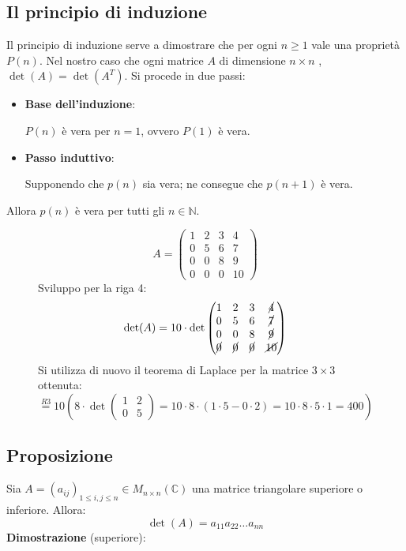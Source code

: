 \documentclass[a4paper]{article}
\theoremstyle{break}
\theoremstyle{break}
\theoremstyle{break}
\theoremstyle{break}
\begin{document}
\subsection{Il principio di induzione}
Il principio di induzione serve a dimostrare che per ogni \( n \ge 1 \) vale una 
proprietà \( P(n) \). Nel nostro caso che ogni matrice \( A \) di dimensione \( n \times n \) 
, \( \det(A) = \det(A^T) \). Si procede in due passi:
\begin{itemize}
  \item \textbf{Base dell'induzione}:

    \( P(n) \) è vera per \( n = 1 \), ovvero \( P(1) \) è vera.
  \item \textbf{Passo induttivo}:

    Supponendo che \( p(n) \) sia vera; ne consegue che \( p(n+1) \) è vera.
\end{itemize}
Allora \( p(n) \) è vera per tutti gli \( n \in \mathbb{N} \).

\begin{figure}[H]
  \begin{example}
    \[
    A = \begin{pmatrix} 
      1 & 2 & 3 & 4\\
      0 & 5 & 6 & 7\\
      0 & 0 & 8 & 9\\
      0 & 0 & 0 & 10
    \end{pmatrix} 
    \] 
    Sviluppo per la riga 4:
    \[
    \det(A) = 10 \cdot \det\begin{pmatrix} 
      1 & 2 & 3 & \cancel{4}\\
      0 & 5 & 6 & \cancel{7}\\
      0 & 0 & 8 & \cancel{9}\\
      \cancel{0} & \cancel{0} & \cancel{0} & \cancel{10}
    \end{pmatrix}
    \] 
    Si utilizza di nuovo il teorema di Laplace per la matrice \( 3 \times 3 \) ottenuta:
    \[
    \stackrel{R3}{=} 10 \left( 8 \cdot \det\begin{pmatrix} 
      1 & 2 \\
      0 & 5
    \end{pmatrix}
    = 10 \cdot 8 \cdot (1 \cdot 5 - 0 \cdot 2) = 10 \cdot 8 \cdot 5 \cdot 1 = 400
    \right) 
    \] 
  \end{example}
\end{figure}

\subsection{Proposizione}
Sia \( A = (a_{ij})_{1 \le i,j \le n} \in M_{n \times n}(\mathbb{C}) \) una matrice
triangolare superiore o inferiore. Allora:
\[
\det(A) = a_{11}a_{22} \ldots a_{nn}
\] 
\textbf{Dimostrazione} (superiore):
\end{document}
